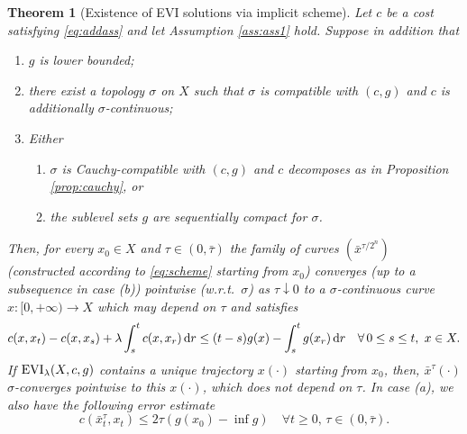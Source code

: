\documentclass[reqno]{amsart}
\newcounter{results}[section]
\theoremstyle{plain}
\newtheorem{theorem}[results]{Theorem}
\theoremstyle{remark}
\theoremstyle{plain}
\numberwithin{equation}{section}
\theoremstyle{remark}
\newcommand{\de}{{\,\rm d}}
\DeclareMathOperator{\EVI}{{\rm EVI}}
\begin{document}
\begin{theorem}[Existence of EVI solutions  via   implicit scheme]\label{thm:existence_limit_scheme}  Let $c$ be a cost satisfying \eqref{eq:addass}  and let   Assumption \ref{ass:ass1} hold. Suppose   in  addition that 
\begin{enumerate}
    \item $g$ is lower bounded;
    \item there exist a topology $\sigma$ on $X$ such that $\sigma$ is compatible with $(c,g)$ and $c$ is additionally $\sigma$-continuous;
    \item Either
    \begin{enumerate}
        \item $\sigma$ is Cauchy-compatible with $(c,g)$ and $c$ decomposes as in Proposition \ref{prop:cauchy}, or
        \item   the sublevel sets $g$ are sequentially compact for $\sigma$.
    \end{enumerate}
\end{enumerate}
Then, for every $x_0 \in X$ and $\tau \in (0, \bar{\tau})$ the family of curves $(\bar{x}^{\tau/2^n})$ (constructed according to \eqref{eq:scheme} starting from $x_0$) converges (up to a subsequence in case (b)) pointwise (w.r.t.~$\sigma$) as $\tau \downarrow 0$ to a $\sigma$-continuous curve $x:[0,+\infty) \to X$ which may depend on $\tau$ and satisfies
\begin{equation}
c(x, x_t)-c(x,x_s) + \lambda\int_{s}^t c(x,x_r) \de r 
\le (t-s)g(x)-\int_s^t g(x_r) \de r \quad \forall \, 0 \le s \le t, \  x \in X.    \label{eq:evi}
\end{equation}
If $\EVI_\lambda(X,c,g)$  contains  a unique trajectory $x(\cdot)$ starting from $x_0$, then, $\bar{x}^{\tau}(\cdot)$ $\sigma$-converges pointwise to this $x(\cdot)$, which does not depend on $\tau$. In case (a), we  also have the following error estimate
\begin{equation}\label{eq:error_estimate}
    c \left (\bar{x}^{\tau}_t, x_t \right ) \le 2\tau (g(x_0)-\inf g) \quad \forall t \ge 0, \, \tau \in (0, \bar{\tau}).
\end{equation}
\end{theorem}
\end{document}
